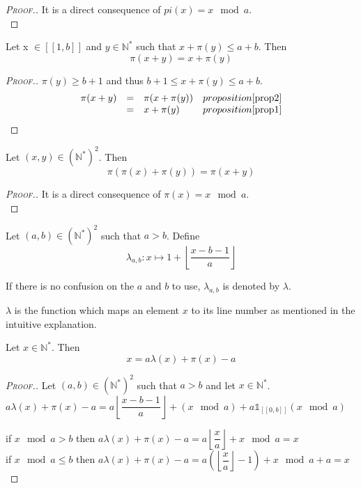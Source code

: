 \begin{proof}[\textsc{Proof.}]
It is a direct consequence of \(pi(x) = x \mod a\). \\
\end{proof}

\begin{proposition}
\label{prop3}
Let x \(\in [\![1,b]\!]\) and \(y \in \mathbb{N}^*\) such that \(x+\pi(y) \leqslant a+b\). Then 
\[
\pi(x+y)=x+\pi(y)
\]
\end{proposition}

\begin{proof}[\textsc{Proof.}]
\(\pi(y) \geqslant b + 1\) and thus \(b + 1 \leqslant x + \pi(y) \leqslant a + b\).
\[
\begin{array}{l l l l}
	\pi(x + y) & = & \pi(x + \pi(y)) & proposition \ref{prop2} \\
	 & = & x + \pi(y) & proposition \ref{prop1}
\end{array}
\]
\end{proof}

\begin{proposition}
\label{prop4}
Let \((x,y)\in (\mathbb{N}^*)^2\). Then 
\[
\pi(\pi(x)+\pi(y))=\pi(x+y)
\]
\end{proposition}

\begin{proof}[\textsc{Proof.}]
It is a direct consequence of \(\pi(x) = x \mod a\). \\
\end{proof}

\begin{definition}
Let \((a,b) \in (\mathbb{N}^*)^2\) such that \(a>b\). Define
\[ \lambda_{a,b}:x \longmapsto 1+ \left\lfloor\dfrac{x-b-1}{a}\right\rfloor\]
\end{definition}

If there is no confusion on the \(a\) and \(b\) to use, \(\lambda_{a, b}\) is denoted by \(\lambda\).

\(\lambda\) is the function which maps an element \(x\) to its line number as mentioned in the intuitive explanation.

\begin{proposition}
\label{prop5}
Let \(x\in \mathbb{N}^*\). Then 
\[
x=a\lambda(x)+\pi(x)-a
\]
\end{proposition}

\begin{proof}[\textsc{Proof.}]
Let \((a,b)\in (\mathbb{N}^*)^2\) such that \(a>b\) and let \(x\in \mathbb{N}^*\). \\
\(a\lambda(x)+\pi(x)-a=a\left\lfloor\dfrac{x-b-1}{a}\right\rfloor+(x \mod a)+ a \mathds{1}_{ [\![0,b]\!]}(x \mod a)\)

\noindent  if \(x \mod a>b\) then \(a\lambda(x)+\pi(x)-a=a\left\lfloor\dfrac{x}{a}\right\rfloor+x \mod a=x\) \\
\vspace{1mm}
\noindent if \(x \mod a \leqslant b\) then
\(a\lambda(x)+\pi(x)-a=a \left( \left \lfloor \dfrac{x}{a} \right \rfloor - 1 \right)+x \mod a +a=x\) \\
\end{proof}


